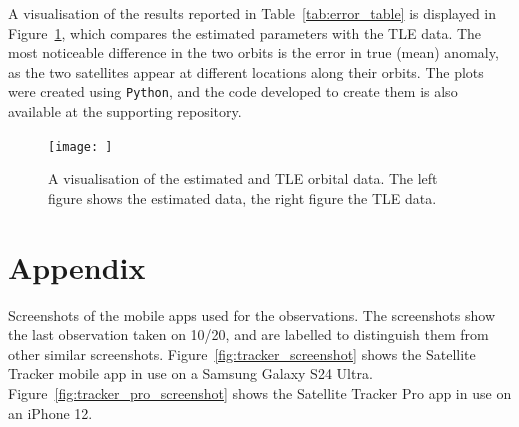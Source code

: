 \documentclass{article}
\begin{document}
A visualisation of the results reported in Table~\ref{tab:error_table} is displayed in Figure~\ref{fig:data_visualisation}, which compares the estimated parameters with the TLE data. The most noticeable difference in the two orbits is the error in true (mean) anomaly, as the two satellites appear at different locations along their orbits. The plots were created using \texttt{Python}, and the code developed to create them is also available at the supporting repository.

\begin{figure}
    \centering
    \texttt{[image: ]}
    \caption{A visualisation of the estimated and TLE orbital data. The left figure shows the estimated data, the right figure the TLE data.}
    \label{fig:data_visualisation}
\end{figure}

\printbibliography

\newpage
\appendix
\section{Appendix} \label{Appendix}

Screenshots of the mobile apps used for the observations. The screenshots show the last observation taken on 10/20, and are labelled to distinguish them from other similar screenshots. Figure~\ref{fig:tracker_screenshot} shows the Satellite Tracker mobile app in use on a Samsung Galaxy S24 Ultra. Figure~\ref{fig:tracker_pro_screenshot} shows the Satellite Tracker Pro app in use on an iPhone 12.
\end{document}
